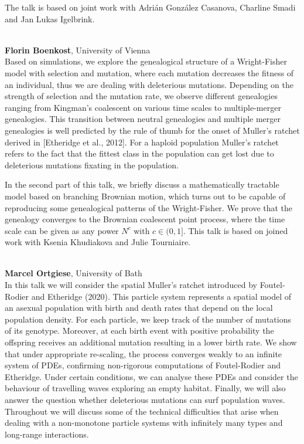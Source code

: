 \documentclass[12pt,a4paper]{article}
\begin{document}
 The talk is based on joint work with Adri\'an Gonz\'alez Casanova, Charline Smadi and Jan Lukas Igelbrink. 

\bigskip\bigskip

\\[1ex]{ \large \textbf{ Florin Boenkost}}, University of Vienna \\[2ex] Based on simulations, we explore the genealogical structure of a Wright-Fisher model with selection and mutation, where each mutation decreases the fitness of an individual, thus we are dealing with deleterious mutations. Depending on the strength of selection and the mutation rate, we observe different genealogies ranging from Kingman's coalescent on various time scales to multiple-merger genealogies. This transition between neutral genealogies and multiple merger genealogies is well predicted by the rule of thumb for the onset of Muller's ratchet derived in [Etheridge et al., 2012]. For a haploid population Muller's ratchet refers to the fact that the fittest class in the population can get lost due to deleterious mutations fixating in the population. 

 In the second part of this talk, we briefly discuss a mathematically tractable model based on branching Brownian motion, which turns out to be capable of reproducing some genealogical patterns of the Wright-Fisher. We prove that the genealogy converges to the Brownian coalescent point process, where the time scale can be given as any power $N^c$ with $c \in (0,1]$. This talk is based on joined work with Ksenia Khudiakova and Julie Tourniaire. 

\bigskip\bigskip

\\[1ex]{ \large \textbf{ Marcel Ortgiese}}, University of Bath \\[2ex] In this talk we will consider the spatial Muller's ratchet introduced by Foutel-Rodier and Etheridge (2020). This particle system represents a spatial model of an asexual population with birth and death rates that depend on the local population density. For each particle, we keep track of the number of mutations of its genotype. Moreover, at each birth event with positive probability the offspring receives an additional mutation resulting in a lower birth rate. We show that under appropriate re-scaling, the process converges weakly to an infinite system of PDEs, confirming non-rigorous computations of Foutel-Rodier and Etheridge. Under certain conditions, we can analyse these PDEs and consider the behaviour of travelling waves exploring an empty habitat. Finally, we will also answer the question whether deleterious mutations can surf population waves. Throughout we will discuss some of the technical difficulties that arise when dealing with a non-monotone particle systems with infinitely many types and long-range interactions. 
\end{document}
